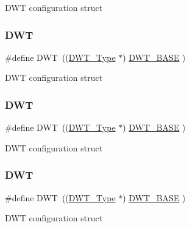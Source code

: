 D\+WT configuration struct \mbox{\label{group___c_m_s_i_s__core__base_gabbe5a060185e1d5afa3f85b14e10a6ce}} 
\subsubsection{\texorpdfstring{DWT}{DWT}\hspace{0.1cm}{\footnotesize\ttfamily [6/8]}}
{\footnotesize\ttfamily \#define D\+WT~((\mbox{\hyperlink{struct_d_w_t___type}{D\+W\+T\+\_\+\+Type}}       $\ast$)     \mbox{\hyperlink{group___c_m_s_i_s__core__base_gafdab534f961bf8935eb456cb7700dcd2}{D\+W\+T\+\_\+\+B\+A\+SE}}      )}

D\+WT configuration struct \mbox{\label{group___c_m_s_i_s__core__base_gabbe5a060185e1d5afa3f85b14e10a6ce}} 
\subsubsection{\texorpdfstring{DWT}{DWT}\hspace{0.1cm}{\footnotesize\ttfamily [7/8]}}
{\footnotesize\ttfamily \#define D\+WT~((\mbox{\hyperlink{struct_d_w_t___type}{D\+W\+T\+\_\+\+Type}}       $\ast$)     \mbox{\hyperlink{group___c_m_s_i_s__core__base_gafdab534f961bf8935eb456cb7700dcd2}{D\+W\+T\+\_\+\+B\+A\+SE}}         )}

D\+WT configuration struct \mbox{\label{group___c_m_s_i_s__core__base_gabbe5a060185e1d5afa3f85b14e10a6ce}} 
\subsubsection{\texorpdfstring{DWT}{DWT}\hspace{0.1cm}{\footnotesize\ttfamily [8/8]}}
{\footnotesize\ttfamily \#define D\+WT~((\mbox{\hyperlink{struct_d_w_t___type}{D\+W\+T\+\_\+\+Type}}       $\ast$)     \mbox{\hyperlink{group___c_m_s_i_s__core__base_gafdab534f961bf8935eb456cb7700dcd2}{D\+W\+T\+\_\+\+B\+A\+SE}}         )}

D\+WT configuration struct \mbox{\label{group___c_m_s_i_s__core__base_gafdab534f961bf8935eb456cb7700dcd2}} 
